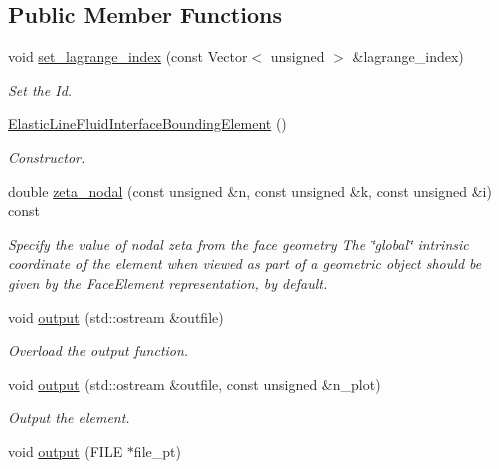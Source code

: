 \subsection*{Public Member Functions}
\begin{DoxyCompactItemize}
\item 
void \hyperlink{classoomph_1_1ElasticLineFluidInterfaceBoundingElement_a524b359509676cd429729e0dde59da92}{set\+\_\+lagrange\+\_\+index} (const Vector$<$ unsigned $>$ \&lagrange\+\_\+index)
\begin{DoxyCompactList}\small\item\em Set the Id. \end{DoxyCompactList}\item 
\hyperlink{classoomph_1_1ElasticLineFluidInterfaceBoundingElement_ad531b7e5debaecc74d64755c82bbc17d}{Elastic\+Line\+Fluid\+Interface\+Bounding\+Element} ()
\begin{DoxyCompactList}\small\item\em Constructor. \end{DoxyCompactList}\item 
double \hyperlink{classoomph_1_1ElasticLineFluidInterfaceBoundingElement_a1d8a7213d7bd2826bc59af770f66f402}{zeta\+\_\+nodal} (const unsigned \&n, const unsigned \&k, const unsigned \&i) const
\begin{DoxyCompactList}\small\item\em Specify the value of nodal zeta from the face geometry The \char`\"{}global\char`\"{} intrinsic coordinate of the element when viewed as part of a geometric object should be given by the Face\+Element representation, by default. \end{DoxyCompactList}\item 
void \hyperlink{classoomph_1_1ElasticLineFluidInterfaceBoundingElement_a50444fef924185e8d462238045e24543}{output} (std\+::ostream \&outfile)
\begin{DoxyCompactList}\small\item\em Overload the output function. \end{DoxyCompactList}\item 
void \hyperlink{classoomph_1_1ElasticLineFluidInterfaceBoundingElement_a7a0df1419f28df0351ed1c5e05f8f751}{output} (std\+::ostream \&outfile, const unsigned \&n\+\_\+plot)
\begin{DoxyCompactList}\small\item\em Output the element. \end{DoxyCompactList}\item 
void \hyperlink{classoomph_1_1ElasticLineFluidInterfaceBoundingElement_a0979784b94ab8285a964ab14077b8320}{output} (F\+I\+LE $\ast$file\+\_\+pt)

\end{DoxyCompactItemize}
